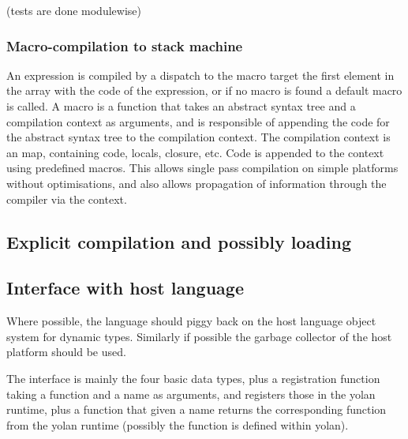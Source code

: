 (tests are done modulewise)



\subsubsection{Macro-compilation to stack machine}
An expression is compiled by a dispatch to the macro target the first element in the array with the code of the expression, or if no macro is found a default macro is called.
A macro is a function that takes an abstract syntax tree and a compilation context as arguments, and is responsible of appending the code for the abstract syntax tree to the compilation context.
The compilation context is an map, containing code, locals, closure, etc. 
Code is appended to the context using predefined macros.
This allows single pass compilation on simple platforms without optimisations, and also allows propagation of information through the compiler via the context.

\subsection{Explicit compilation and possibly loading}

\subsection{Interface with host language}
Where possible, the language should piggy back on the host language object system for dynamic types. Similarly if possible the garbage collector of the host platform should be used.

The interface is mainly the four basic data types, plus a registration function taking a function and a name as arguments, and registers those in the yolan runtime, plus a function that given a name returns the corresponding function from the yolan runtime (possibly the function is defined within yolan).

